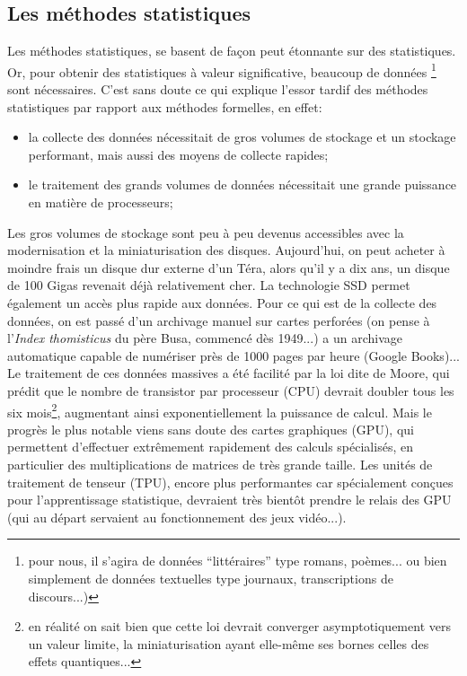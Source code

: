 \documentclass{article}
\begin{document}
		\subsection{Les méthodes statistiques}
			Les méthodes statistiques, se basent de façon peut étonnante sur des statistiques. Or, pour obtenir des statistiques à valeur significative, beaucoup de données \footnote{pour nous, il s'agira de données ``littéraires'' type romans, poèmes... ou bien simplement de données textuelles type journaux, transcriptions de discours...)} sont nécessaires. C'est sans doute ce qui explique l'essor tardif des méthodes statistiques par rapport aux méthodes formelles, en effet:
			\begin{itemize}
				\item la collecte des données nécessitait de gros volumes de stockage et un stockage performant, mais aussi des moyens de collecte rapides;
				\item le traitement des grands volumes de données nécessitait une grande puissance en matière de processeurs;
			\end{itemize}
			Les gros volumes de stockage sont peu à peu devenus accessibles avec la modernisation et la miniaturisation des disques. Aujourd'hui, on peut acheter à moindre frais un disque dur externe d'un Téra, alors qu'il y a dix ans, un disque de 100 Gigas revenait déjà relativement cher. La technologie SSD permet également un accès plus rapide aux données. Pour ce qui est de la collecte des données, on est passé d'un archivage manuel sur cartes perforées (on pense à l'\textit{Index thomisticus} du père Busa, commencé dès 1949...) a un archivage automatique capable de numériser près de 1000 pages par heure (Google Books)...\\
				Le traitement de ces données massives a été facilité par la loi dite de Moore, qui prédit que le nombre de transistor par processeur (CPU) devrait doubler tous les six mois\footnote{en réalité on sait bien que cette loi devrait converger asymptotiquement vers un valeur limite, la miniaturisation ayant elle-même ses bornes celles des effets quantiques...}, augmentant ainsi exponentiellement la puissance de calcul. Mais le progrès le plus notable viens sans doute des cartes graphiques (GPU), qui permettent d'effectuer extrêmement rapidement des calculs spécialisés, en particulier des multiplications de matrices de très grande taille. Les unités de traitement de tenseur (TPU), encore plus performantes car spécialement conçues pour l'apprentissage statistique, devraient très bientôt prendre le relais des GPU (qui au départ servaient au fonctionnement des jeux vidéo...).
\end{document}
